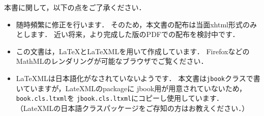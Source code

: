 \documentclass{jbook}
\begin{document}
本書に関して，以下の点をご了承ください．
\begin{itemize}
\item 随時頻繁に修正を行います．
	そのため，本文書の配布は当面xhtml形式のみとします．
	近い将来，より完成した版のPDFでの配布を検討中です．

\item この文書は，LaTeXとLaTeXMLを用いて作成しています．
FirefoxなどのMathMLのレンダリングが可能なブラウザでご覧ください．

\item LaTeXMLは日本語化がなされていないようです．
	本文書は{\tt jbook}クラスで書いていますが，LateXMLのpackageに
jbook用が用意されていないため，{\tt book.cls.ltxml}を
{\tt jbook.cls.ltxml}にコピーし使用しています．
	（LateXMLの日本語クラスパッケージをご存知の方はお教えください．）
\end{itemize}
\end{document}
